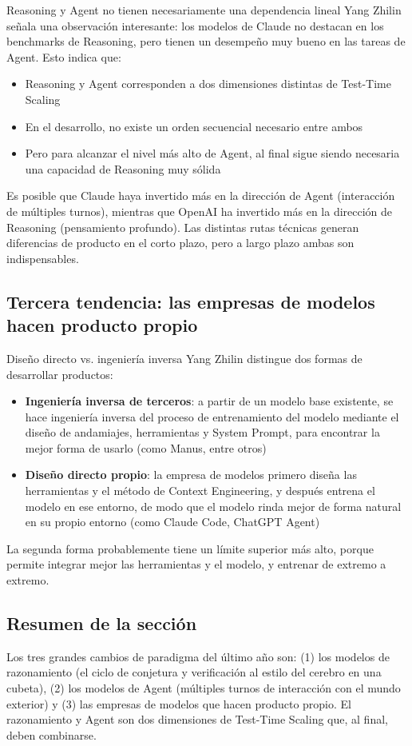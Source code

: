 \begin{knowledgebox}{Reasoning y Agent no tienen necesariamente una dependencia lineal}
Yang Zhilin señala una observación interesante: los modelos de Claude no destacan en los benchmarks de Reasoning, pero tienen un desempeño muy bueno en las tareas de Agent. Esto indica que:
\begin{itemize}
    \item Reasoning y Agent corresponden a dos dimensiones distintas de Test-Time Scaling
    \item En el desarrollo, no existe un orden secuencial necesario entre ambos
    \item Pero para alcanzar el nivel más alto de Agent, al final sigue siendo necesaria una capacidad de Reasoning muy sólida
\end{itemize}
Es posible que Claude haya invertido más en la dirección de Agent (interacción de múltiples turnos), mientras que OpenAI ha invertido más en la dirección de Reasoning (pensamiento profundo). Las distintas rutas técnicas generan diferencias de producto en el corto plazo, pero a largo plazo ambas son indispensables.
\end{knowledgebox}

\subsection{Tercera tendencia: las empresas de modelos hacen producto propio}

\begin{importantbox}{Diseño directo vs. ingeniería inversa}
Yang Zhilin distingue dos formas de desarrollar productos:
\begin{itemize}
    \item \textbf{Ingeniería inversa de terceros}: a partir de un modelo base existente, se hace ingeniería inversa del proceso de entrenamiento del modelo mediante el diseño de andamiajes, herramientas y System Prompt, para encontrar la mejor forma de usarlo (como Manus, entre otros)
    \item \textbf{Diseño directo propio}: la empresa de modelos primero diseña las herramientas y el método de Context Engineering, y después entrena el modelo en ese entorno, de modo que el modelo rinda mejor de forma natural en su propio entorno (como Claude Code, ChatGPT Agent)
\end{itemize}
La segunda forma probablemente tiene un límite superior más alto, porque permite integrar mejor las herramientas y el modelo, y entrenar de extremo a extremo.
\end{importantbox}

\subsection{Resumen de la sección}

Los tres grandes cambios de paradigma del último año son: (1) los modelos de razonamiento (el ciclo de conjetura y verificación al estilo del cerebro en una cubeta), (2) los modelos de Agent (múltiples turnos de interacción con el mundo exterior) y (3) las empresas de modelos que hacen producto propio. El razonamiento y Agent son dos dimensiones de Test-Time Scaling que, al final, deben combinarse.

